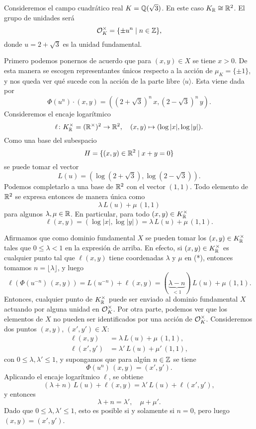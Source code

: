 \begin{ejemplo}
  \label{ejemplo:conjunto-X-Q(sqrt3)}
  Consideremos el campo cuadrático real $K = \mathbb{Q} (\sqrt{3})$. En este caso
  $K_{\mathbb{R}} \cong \mathbb{R}^2$. El grupo de unidades será
  $$\mathcal{O}_K^\times = \{ \pm u^n \mid n \in \mathbb{Z} \},$$
  donde $u = 2 + \sqrt{3}$ es la unidad fundamental.

  Primero podemos ponernos de acuerdo que para $(x,y) \in X$ se tiene
  $x > 0$. De esta manera se escogen representantes únicos respecto a la acción
  de $\mu_K = \{ \pm 1 \}$, y nos queda ver qué sucede con la acción de la parte
  libre $\langle u\rangle$.  Esta viene dada por
  $$\Phi (u^n)\cdot (x,y) = ((2 + \sqrt{3})^n\,x, (2 - \sqrt{3})^n\,y).$$
  Consideremos el encaje logarítmico
  \[ \ell\colon K_{\mathbb{R}}^\times = (\mathbb{R}^\times)^2 \to \mathbb{R}^2, \quad
     (x,y) \mapsto (\log |x|, \log |y|). \]
  Como una base del subespacio
  $$H = \{ (x,y) \in \mathbb{R}^2 \mid x+y = 0 \}$$
  se puede tomar el vector
  $$L (u) = (\log (2 + \sqrt{3}), \log (2 - \sqrt{3})).$$
  Podemos completarlo a una base de $\mathbb{R}^2$ con el vector
  $(1,1)$. Todo elemento de $\mathbb{R}^2$ se expresa entonces de manera única como
  $$\lambda\,L (u) + \mu\,(1,1)$$
  para algunos $\lambda, \mu \in \mathbb{R}$. En particular, para todo
  $(x,y) \in K_{\mathbb{R}}^\times$
  \begin{equation}
    \tag{*} \ell (x,y) = (\log |x|, \log |y|) = \lambda\,L (u) + \mu\,(1,1).
  \end{equation}

  Afirmamos que como dominio fundamental $X$ se pueden tomar
  los $(x,y) \in K_{\mathbb{R}}^\times$ tales que $0 \le \lambda < 1$ en la expresión de
  arriba. En efecto, si $(x,y) \in K_{\mathbb{R}}^\times$ es cualquier punto tal que
  $\ell (x,y)$ tiene coordenadas $\lambda$ y $\mu$ en (*), entonces tomamos
  $n = \lfloor\lambda\rfloor$, y luego
  \[ \ell (\Phi (u^{-n})\,(x,y)) = L (u^{-n}) + \ell (x,y) =
     (\underbrace{\lambda - n}_{< 1})\,L(u) + \mu\,(1,1). \]
  Entonces, cualquier punto de $K_{\mathbb{R}}^\times$ puede ser enviado al dominio
  fundamental $X$ actuando por alguna unidad en $\mathcal{O}_K^\times$. Por otra parte,
  podemos ver que los elementos de $X$ no pueden ser identificados por una
  acción de $\mathcal{O}_K^\times$. Consideremos dos puntos $(x,y)$, $(x',y') \in X$:
  \begin{align*}
    \ell (x,y) & = \lambda\,L (u) + \mu\,(1,1), \\
    \ell (x', y') & = \lambda'\,L (u) + \mu'\,(1,1),
  \end{align*}
  con $0 \le \lambda,\lambda' \le 1$, y supongamos que para algún
  $n \in \mathbb{Z}$ se tiene
  $$\Phi (u^n)\,(x,y) = (x',y').$$
  Aplicando el encaje logarítmico $\ell$, se obtiene
  $$(\lambda + n)\,L(u) + \ell (x,y) = \lambda'\,L (u) + \ell (x',y'),$$
  y entonces
  $$\lambda + n = \lambda', \quad \mu + \mu'.$$
  Dado que $0 \le \lambda,\lambda' \le 1$, esto es posible si y solamente si
  $n = 0$, pero luego $(x,y) = (x',y')$.


\end{ejemplo}
